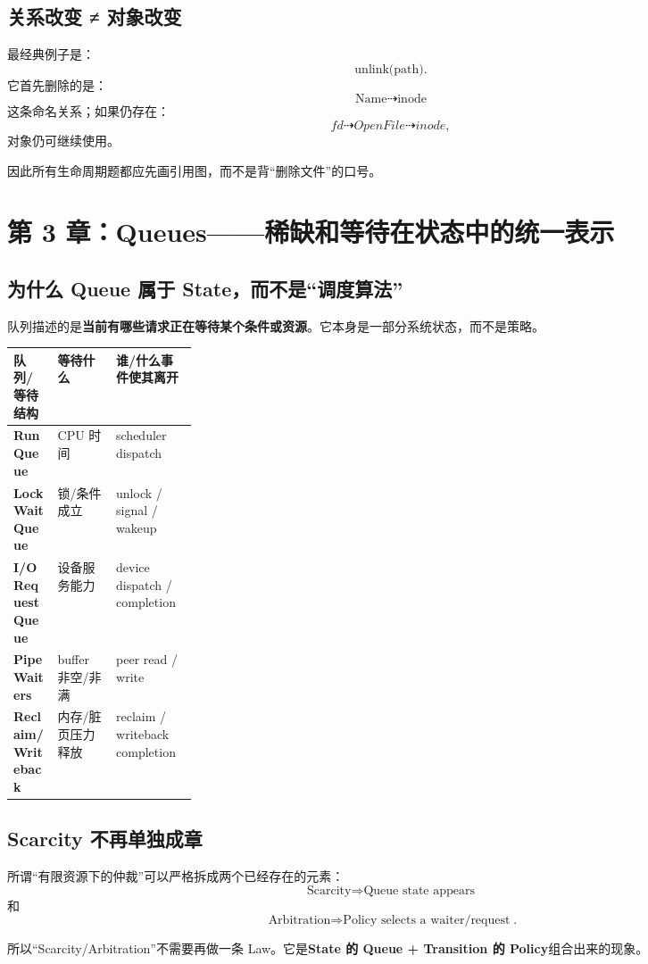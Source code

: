 \documentclass[11pt,a4paper]{ctexart}
\newcommand{\kw}[1]{\textbf{#1}}
\begin{document}
\subsection{关系改变 ≠ 对象改变}
最经典例子是：
\[
\text{unlink(path)}.
\]
它首先删除的是：
\[
\text{Name}\dashrightarrow\text{inode}
\]
这条命名关系；如果仍存在：
\[
fd\dashrightarrow OpenFile\dashrightarrow inode,
\]
对象仍可继续使用。

因此所有生命周期题都应先画引用图，而不是背“删除文件”的口号。

\section{第 3 章：Queues——稀缺和等待在状态中的统一表示}

\subsection{为什么 Queue 属于 State，而不是“调度算法”}
队列描述的是\kw{当前有哪些请求正在等待某个条件或资源}。它本身是一部分系统状态，而不是策略。

\begin{center}
\scriptsize
\begin{tabularx}{\linewidth}{>{\bfseries}p{0.24\linewidth} Y Y}
\toprule
队列/等待结构 & 等待什么 & 谁/什么事件使其离开 \\
\midrule
Run Queue & CPU 时间 & scheduler dispatch \\
Lock Wait Queue & 锁/条件成立 & unlock / signal / wakeup \\
I/O Request Queue & 设备服务能力 & device dispatch / completion \\
Pipe Waiters & buffer 非空/非满 & peer read / write \\
Reclaim/Writeback & 内存/脏页压力释放 & reclaim / writeback completion \\
\bottomrule
\end{tabularx}
\end{center}

\subsection{Scarcity 不再单独成章}
所谓“有限资源下的仲裁”可以严格拆成两个已经存在的元素：
\[
\boxed{\text{Scarcity}\Rightarrow\text{Queue state appears}}
\]
和
\[
\boxed{\text{Arbitration}\Rightarrow\text{Policy selects a waiter/request}}.
\]

所以“Scarcity/Arbitration”不需要再做一条 Law。它是\kw{State 的 Queue + Transition 的 Policy}组合出来的现象。
\end{document}
